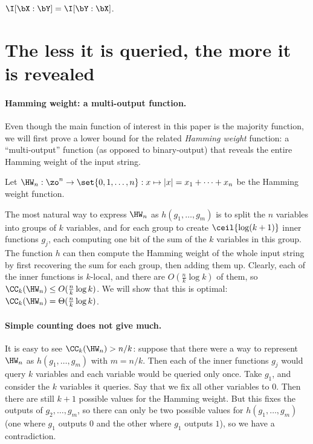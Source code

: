 \begin{fact}
$\I[\bX:\bY] = \I[\bY:\bX]$.
\end{fact}

\section{The less it is queried, the more it is revealed}
\label{sec:hw-lb}

\paragraph*{Hamming weight: a multi-output function.}
Even though the main function of interest in this paper is the majority function, we will first
prove a lower bound for the related \emph{Hamming weight} function: a ``multi-output'' function (as opposed to binary-output) that reveals the entire Hamming weight of the input string.
\begin{definition}
Let $\HW_n : \zo^n \to \set{0,1,\ldots, n} : x \mapsto |x| = x_1 + \cdots + x_n$ be the Hamming weight function.
\end{definition}

The most natural way to
express $\HW_n$ as $h(g_1, \ldots, g_m)$
is to split the $n$ variables into groups of $k$ variables, and for each group to create $\ceil{\log (k+1)}$ inner functions $g_j$, each computing one bit of the sum of the $k$ variables in this group.
The function $h$ can then compute the Hamming weight of the whole input string by first recovering the sum for each group, then adding them up.
Clearly, each of the inner functions is $k$-local,
and there are $O(\frac{n}{k}\log k)$ of them, so $\CC_k(\HW_n) \leq O(\frac{n}{k}\log k)$.
We will show that this is optimal: $\CC_k(\HW_n) = \Theta(\frac{n}{k}\log k)$.


\paragraph*{Simple counting does not give much.}
It is easy to see $\CC_k(\HW_n)>n/k$:
suppose that there were a way to represent $\HW_n$ as $h(g_1, \ldots, g_m)$ with $m=n/k$.
Then each of the inner functions $g_j$ would query $k$ variables and each variable would be queried only once.
Take $g_1$, and consider the $k$ variables it queries.
Say that we fix all other variables to $0$.
Then there are still $k+1$ possible values for the Hamming weight.
But this fixes the outputs of $g_2,\ldots, g_m$, so there can only be two possible values for $h(g_1, \ldots, g_m)$ (one where $g_1$ outputs $0$ and the other where $g_1$ outputs $1$), so we have a contradiction.

